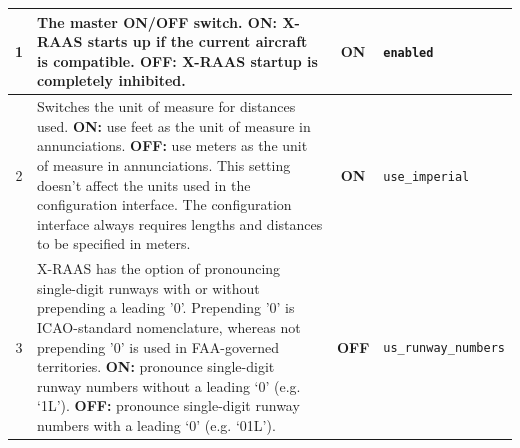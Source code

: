 \documentclass[a4paper,12pt]{article}
\newcommand{\confopt}[1]{\texttt{#1}}
\begin{document}
\newcommand{\guiconfbtn}[1]{#1\label{gui_conf_btn_label_#1}}

{\footnotesize
\begin{center}
\tablelasttail{\hline}
\begin{supertabular}{|c|p{8cm}|c|l|}

\guiconfbtn{1} &
The master ON/OFF switch.\newline
\textbf{ON:} X-RAAS starts up if the current aircraft is compatible.\newline
\textbf{OFF:} X-RAAS startup is completely inhibited. &
\textbf{ON} &
\confopt{enabled} \\

\hline

\guiconfbtn{2} &
Switches the unit of measure for distances used.\newline
\textbf{ON:} use feet as the unit of measure in annunciations.\newline
\textbf{OFF:} use meters as the unit of measure in annunciations.\newline
This setting doesn't affect the units used in the configuration
interface. The configuration interface always requires lengths and
distances to be specified in meters. & \textbf{ON} &
\confopt{use\_imperial} \\

\hline

\guiconfbtn{3} &
X-RAAS has the option of pronouncing single-digit runways with or without
prepending a leading '0'. Prepending '0' is ICAO-standard nomenclature,
whereas not prepending '0' is used in FAA-governed territories.\newline
\textbf{ON:} pronounce single-digit runway numbers without a leading `0'
(e.g. `1L').\newline
\textbf{OFF:} pronounce single-digit runway numbers with a leading `0'
(e.g. `01L'). & \textbf{OFF} & \confopt{us\_runway\_numbers} \\


\end{supertabular}
\end{center}}
\end{document}
